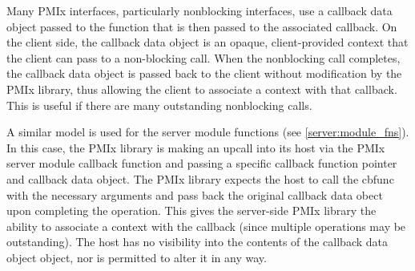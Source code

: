 Many \ac{PMIx} interfaces, particularly nonblocking interfaces, use a  callback data object passed to the function that is then passed to the associated callback. On the client side, the callback data object is an opaque, client-provided context that the client can pass to a non-blocking call. When the nonblocking call completes, the callback data object is passed back to the client without modification by the \ac{PMIx} library, thus allowing the client to associate a context with that callback. This is useful if there are many outstanding nonblocking calls.

A similar model is used for the server module functions (see \ref{server:module_fns}). In this case, the \ac{PMIx} library is making an upcall into its host via the \ac{PMIx} server module callback function and passing a specific callback function pointer and callback data object. The \ac{PMIx} library expects the host to call the cbfunc with the necessary arguments and pass back the original callback data obect upon completing the operation. This gives the server-side \ac{PMIx} library the ability to associate a context with the callback (since multiple operations may be outstanding). The host has no visibility into the contents of the callback data object object, nor is permitted to alter it in any way.
